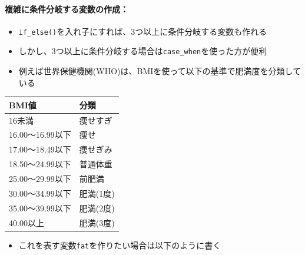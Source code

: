 \documentclass[
]{book}
\providecommand{\tightlist}{%
  \setlength{\itemsep}{0pt}\setlength{\parskip}{0pt}}
\begin{document}
\hypertarget{ux8907ux96d1ux306bux6761ux4ef6ux5206ux5c90ux3059ux308bux5909ux6570ux306eux4f5cux6210}{%
\paragraph*{複雑に条件分岐する変数の作成：}\label{ux8907ux96d1ux306bux6761ux4ef6ux5206ux5c90ux3059ux308bux5909ux6570ux306eux4f5cux6210}}

\begin{itemize}
\tightlist
\item
  \texttt{if\_else()}を入れ子にすれば、3つ以上に条件分岐する変数も作れる
\item
  しかし、3つ以上に条件分岐する場合は\texttt{case\_when}を使った方が便利
\item
  例えば世界保健機関(WHO)は、BMIを使って以下の基準で肥満度を分類している
\end{itemize}

\begin{longtable}[]{@{}ll@{}}
\toprule\noalign{}
BMI値 & 分類 \\
\midrule\noalign{}
\endhead
\bottomrule\noalign{}
\endlastfoot
16未満 & 痩せすぎ \\
16.00〜16.99以下 & 痩せ \\
17.00〜18.49以下 & 痩せぎみ \\
18.50〜24.99以下 & 普通体重 \\
25.00〜29.99以下 & 前肥満 \\
30.00〜34.99以下 & 肥満(1度) \\
35.00〜39.99以下 & 肥満(2度) \\
40.00以上 & 肥満(3度) \\
\end{longtable}

\begin{itemize}
\tightlist
\item
  これを表す変数\texttt{fat}を作りたい場合は以下のように書く
\end{itemize}
\end{document}
